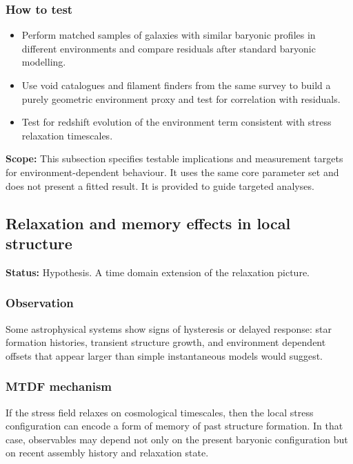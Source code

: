 \documentclass[11pt,a4paper]{article}
\begin{document}
\subsubsection{How to test}
\begin{itemize}
  \item Perform matched samples of galaxies with similar baryonic profiles in different environments and compare residuals after standard baryonic modelling.
  \item Use void catalogues and filament finders from the same survey to build a purely geometric environment proxy and test for correlation with residuals.
  \item Test for redshift evolution of the environment term consistent with stress relaxation timescales.
\end{itemize}

\begin{mdframed}[linecolor=accent,linewidth=0.5pt,backgroundcolor=callout-bg,leftline=true,rightline=true,topline=true,bottomline=true,innerleftmargin=8pt,innerrightmargin=8pt,innertopmargin=6pt,innerbottommargin=6pt]
\textbf{Scope:} This subsection specifies testable implications and measurement targets for environment-dependent behaviour. It uses the same core parameter set and does not present a fitted result. It is provided to guide targeted analyses.
\end{mdframed}

\subsection{Relaxation and memory effects in local structure}
\begin{mdframed}[linecolor=accent,linewidth=0.5pt,backgroundcolor=callout-bg,leftline=true,rightline=true,topline=true,bottomline=true,innerleftmargin=8pt,innerrightmargin=8pt,innertopmargin=6pt,innerbottommargin=6pt]
\textbf{Status:} Hypothesis. A time domain extension of the relaxation picture.
\end{mdframed}

\subsubsection{Observation}
Some astrophysical systems show signs of hysteresis or delayed response: star formation histories, transient structure growth, and environment dependent offsets that appear larger than simple instantaneous models would suggest.

\subsubsection{MTDF mechanism}
If the stress field relaxes on cosmological timescales, then the local stress configuration can encode a form of memory of past structure formation. In that case, observables may depend not only on the present baryonic configuration but on recent assembly history and relaxation state.
\end{document}
